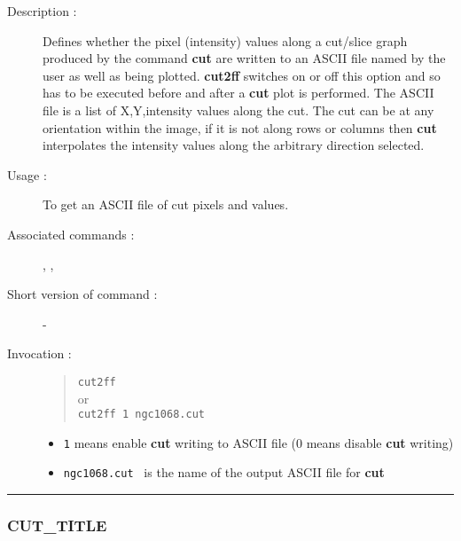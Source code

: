 \begin{description}

\item[Description :] Defines whether the pixel (intensity) values along
a cut/slice graph produced by the command {\bf cut} are written to an ASCII
file named by the user as well as being plotted.  {\bf cut2ff} switches on or
off this option and so has to be executed before and after a {\bf cut} plot
is performed.  The ASCII file is a list of X,Y,intensity values along
the cut.  The cut can be at any orientation within the image, if it is
not along rows or columns then {\bf cut} interpolates the intensity values
along the arbitrary direction selected.

\item[Usage :] To get an ASCII file of cut pixels and values.
\item[Associated commands :] {\tt {}},
{\tt {}}, {\tt {}}
\item[Short version of command :] -
\item[Invocation :]

\begin{quote}{\tt  cut2ff }\\
or \\
{\tt cut2ff 1 ngc1068.cut }
\end{quote}

\begin{itemize}

\item {\tt 1} means enable {\bf cut} writing to ASCII file
(0 means disable {\bf cut} writing)
\item {\tt ngc1068.cut } is the name of the output ASCII file for {\bf cut}
\end{itemize}

\end{description}

\hrule
\subsubsection*{\label{CUT_TITLE}CUT\_TITLE}


